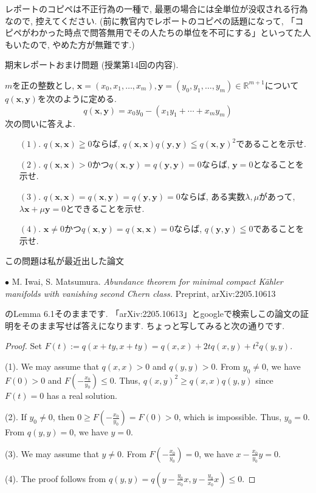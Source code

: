 \documentclass[dvipdfmx,a4paper,11pt]{article}
\newcommand{\R}{\mathbb{R}}
\theoremstyle{definition}
\begin{document}
レポートのコピペは不正行為の一種で, 最悪の場合には全単位が没収される行為なので, 控えてください. (前に教官内でレポートのコピペの話題になって, 「コピペがわかった時点で問答無用でその人たちの単位を不可にする」といってた人もいたので, やめた方が無難です.)

\vspace{22pt}
{\Large 期末レポートおまけ問題}  (授業第14回の内容).
\vspace{11pt}

$m$を正の整数とし, $\bm{x} = (x_0, x_1, \ldots, x_m), \bm{y} = (y_0, y_1, \ldots, y_m)\in \R^{m+1}$について$q(\bm{x},\bm{y})$を次のように定める. 
$$
q(\bm{x},\bm{y}) = x_0 y_0 - (x_1y_1 + \cdots + x_m y_m) 
$$
次の問いに答えよ.
\begin{enumerate}
 \setlength{\parskip}{0cm} %
  \setlength{\itemsep}{0cm}
\item[$(1).$] $q(\bm{x} , \bm{x} )\geqq 0$ならば, $q(\bm{x} , \bm{x})q(\bm{y} , \bm{y}) \leqq q(\bm{x},\bm{y})^2$であることを示せ.
\item[$(2).$] $q(\bm{x} ,\bm{x})>0$かつ$q(\bm{x},\bm{y})=q(\bm{y},\bm{y})=0$ならば, $\bm{y}=0$となることを示せ.
\item[$(3).$] $q(\bm{x},\bm{x})=q(\bm{x},\bm{y})=q(\bm{y},\bm{y})=0$ならば, ある実数$\lambda, \mu$があって, $\lambda \bm{x} + \mu \bm{y}=0$とできることを示せ.
\item[$(4).$] $\bm{x} \neq 0$かつ$q(\bm{x} ,\bm{y})=q(\bm{x},\bm{x})=0$ならば, $q(\bm{y} , \bm{y}) \leqq 0$であることを示せ.
\end{enumerate}

 \vspace{11pt} 
 
\hspace{-11pt}{\Large $\bullet$ 期末レポートおまけ問題解答例.}

この問題は私が最近出した論文

$\bullet$ M. Iwai, S. Matsumura.
\textit{Abundance theorem for minimal compact K\"ahler manifolds with vanishing second Chern class.}
Preprint, arXiv:2205.10613

のLemma 6.1そのままです. 「arXiv:2205.10613」とgoogleで検索しこの論文の証明をそのまま写せば答えになります.
ちょっと写してみると次の通りです.

\begin{proof}
Set $F(t) := q(x+ty, x+ty) = q(x,x)+2tq(x,y) + t^2q(y,y)$.

(1). We may assume that $q(x,x) >0$ and $q(y,y) >0$. From $y_0 \neq0$, we have $F(0) >0$ and $F(-\frac{x_0}{y_0}) \le 0$. Thus, $q(x,y)^2 \ge q(x,x)q(y,y)$ since $F(t)=0$ has a real solution.

(2). If $y_0 \neq 0$, then $0\ge F(-\frac{x_0}{y_0}) =F(0)>0$, which is impossible. Thus, $y_0 =0$. From $q(y,y)=0$, we have $y=0$.

(3). We may assume that $y \neq 0$. From $F(-\frac{x_0}{y_0}) =0$, we have $x - \frac{x_0}{y_0}y=0$.

(4). The proof
follows from $q(y,y)=q(y-\frac{y_0}{x_0}x, y-\frac{y_0}{x_0}x) \le 0$.
\end{proof}
\end{document}
